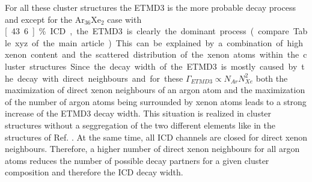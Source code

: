 For all these cluster structures the ETMD3 is the more probable decay process and
except for the Ar$_{36}$Xe$_2$ case with \unit[43.6]{\%} ICD, the ETMD3 is clearly
the dominant process (compare Table xyz of the main article).
This can be explained by a combination of high xenon content and the
scattered distribution of the xenon atoms within the cluster structures.
Since the decay width of the ETMD3 is mostly caused by the decay
with direct neighbours and for these $\Gamma_{ETMD3} \propto N_{Ar} N_{Xe}^2$
both the maximization of direct xenon neighbours of an argon atom and the
maximization of the number of argon atoms being surrounded by xenon atoms
leads to a strong increase of the ETMD3 decay width. This situation is realized
in cluster structures without a seggregation of the two different elements like
in the structures of Ref. \cite{}. At the same time, all ICD channels are closed
for direct xenon neighbours. Therefore, a higher number of direct xenon neighbours
for all argon atoms reduces the number of possible decay partners for a given
cluster composition and therefore the ICD decay width.



%
